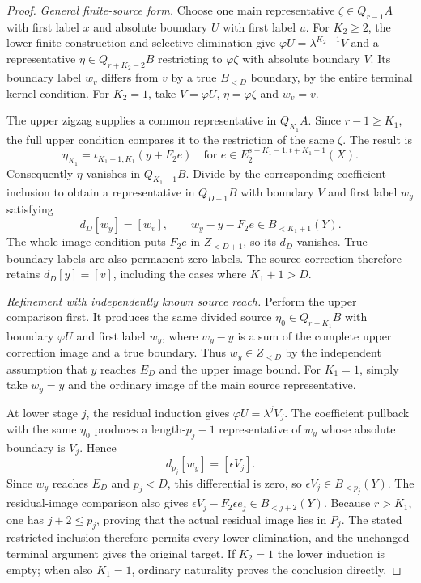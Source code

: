 \begin{proof}
\textit{General finite-source form.}
Choose one main representative $\zeta\in Q_{r-1}A$ with first label
$x$ and absolute boundary $U$ with first label $u$.
For $K_2\ge2$, the lower finite construction and selective elimination
give $\varphi U=\lambda^{K_2-1}V$ and a representative
$\eta\in Q_{r+K_2-2}B$ restricting to $\varphi\zeta$ with absolute
boundary $V$. Its boundary label $w_v$ differs from $v$ by a true
$B_{<D}$ boundary, by the entire terminal kernel condition.
For $K_2=1$, take $V=\varphi U$, $\eta=\varphi\zeta$ and $w_v=v$.

The upper zigzag supplies a common representative in $Q_{K_1}A$.
Since $r-1\ge K_1$, the full upper condition compares it to the
restriction of the same $\zeta$. The result is
\[
\eta_{K_1}=\iota_{K_1-1,K_1}(y+F_2e)
\quad\text{for }e\in E_2^{s+K_1-1,t+K_1-1}(X).
\]
Consequently $\eta$ vanishes in $Q_{K_1-1}B$. Divide by the
corresponding coefficient inclusion to obtain a representative in
$Q_{D-1}B$ with boundary $V$ and first label $w_y$ satisfying
\[
d_D[w_y]=[w_v],\qquad w_y-y-F_2e\in B_{<K_1+1}(Y).
\]
The whole image condition puts $F_2e$ in $Z_{<D+1}$, so its
$d_D$ vanishes. True boundary labels are also permanent zero labels.
The source correction therefore retains $d_D[y]=[v]$, including the cases where $K_1+1>D$.

\textit{Refinement with independently known source reach.}
Perform the upper comparison first. It produces the same divided
source $\eta_0\in Q_{r-K_1}B$ with boundary $\varphi U$ and first
label $w_y$, where $w_y-y$ is a sum of the complete upper correction
image and a true boundary. Thus $w_y\in Z_{<D}$ by the independent
assumption that $y$ reaches $E_D$ and the upper image bound. For $K_1=1$, simply
take $w_y=y$ and the ordinary image of the main source representative.

At lower stage $j$, the residual induction gives
$\varphi U=\lambda^jV_j$. The coefficient pullback with the same
$\eta_0$ produces a length-$p_j-1$ representative of $w_y$ whose
absolute boundary is $V_j$. Hence
\[
d_{p_j}[w_y]=[\epsilon V_j].
\]
Since $w_y$ reaches $E_D$ and $p_j<D$, this differential is zero, so
$\epsilon V_j\in B_{<p_j}(Y)$. The residual-image comparison
also gives $\epsilon V_j-F_2\epsilon e_j\in B_{<j+2}(Y)$.
Because $r>K_1$, one has $j+2\le p_j$, proving that the actual
residual image lies in $P_j$. The stated restricted inclusion therefore
permits every lower elimination, and the unchanged terminal argument
gives the original target. If $K_2=1$ the lower induction is empty;
when also $K_1=1$, ordinary naturality proves the conclusion directly.
\end{proof}


